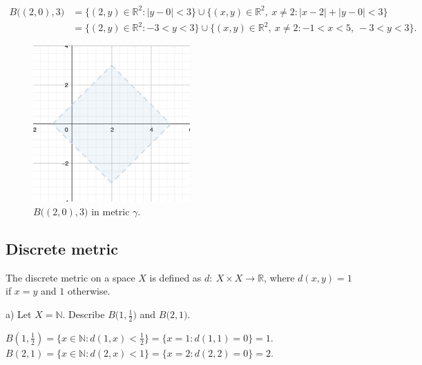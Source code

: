 \documentclass[a4paper,11pt]{article}
\begin{document}
\begin{align*} 
    B \big((2, 0), 3 \big) &= \{(2,y) \in \mathbb{R}^2 : |y - 0| < 3 \} \cup \{(x,y) \in \mathbb{R}^2, \ x \neq 2 : |x - 2| + |y - 0| < 3 \}
    \\
    &= \{(2,y) \in \mathbb{R}^2 : -3 < y < 3 \} \cup \{(x,y) \in \mathbb{R}^2 , \ x \neq 2: -1 < x < 5, \ -3< y < 3 \}.
\end{align*}

\begin{figure}[ht!]
    \centering
    \includegraphics[width=60mm]{d3.png}
    \caption{$B \big((2, 0), 3 \big)$ in metric $\gamma$.}
\end{figure}




\newpage
\subsection{Discrete metric}
The discrete metric on a space $X$ is defined as $d: \ X \times X \to \mathbb{R}$, where $d(x, y) = 1$ if $x = y$ and $1$ otherwise.

\noindent
a) Let $X = \mathbb{N}$. Describe $B \big(1, \frac{1}{2} \big)$ and $B \big(2, 1 \big)$.

\begin{center}
$ B \left(1, \frac{1}{2} \right) = \{ x \in \mathbb{N} : d(1, x) < \frac{1}{2} \} = \{ x = 1 : d(1, 1) = 0 \} = {1}. $
\\
$ B (2, 1) = \{ x \in \mathbb{N} : d(2, x) < 1 \} = \{ x = 2 : d(2, 2) = 0 \} = {2}. $
\\
\end{center}

\end{document}
